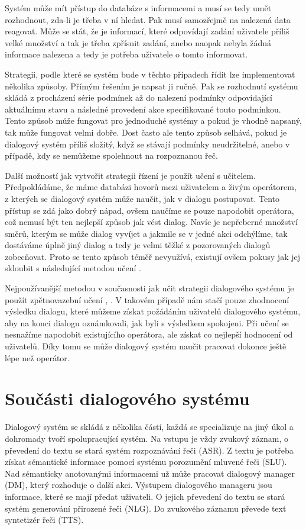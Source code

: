 Systém může mít přístup do databáze s informacemi a musí se tedy umět
rozhodnout, zda-li je třeba v ní hledat. Pak musí samozřejmě na nalezená data
reagovat. Může se stát, že je informací, které odpovídají zadání uživatele
příliš velké množství a tak je třeba zpřísnit zadání, anebo naopak nebyla žádná
informace nalezena a tedy je potřeba uživatele o tomto informovat.

Strategii, podle které se systém bude v těchto případech řídit lze
implementovat několika způsoby. Přímým řešením je napsat ji ručně. Pak se
rozhodnutí systému skládá z procházení série podmínek až do nalezení podmínky
odpovídající aktuálnímu stavu a následné provedení akce specifikované touto
podmínkou. Tento způsob může fungovat pro jednoduché systémy a pokud je vhodně
napsaný, tak může fungovat velmi dobře. Dost často ale tento způsob selhává,
pokud je dialogový systém příliš složitý, když se stávají podmínky
neudržitelné, anebo v případě, kdy se nemůžeme spolehnout na rozpoznanou řeč.

Další možností jak vytvořit strategii řízení je použít učení s učitelem.
Předpokládáme, že máme databázi hovorů mezi uživatelem a živým operátorem, z
kterých se dialogový systém může naučit, jak v dialogu postupovat. Tento
přístup se zdá jako dobrý nápad, ovšem naučíme se pouze napodobit operátora,
což nemusí být ten nejlepší způsob jak vést dialog. Navíc je nepřeberné
množství směrů, kterým se může dialog vyvíjet a jakmile se v jedné akci
odchýlíme, tak dostáváme úplně jiný dialog a tedy je velmi těžké z pozorovaných
dialogů zobecňovat. Proto se tento způsob téměř nevyužívá, existují ovšem
pokusy jak jej skloubit s následující metodou učení \cite{levin2000stochastic}.

Nejpoužívanější metodou v současnosti jak učit strategii dialogového systému
je použít zpětnovazební učení \cite{singh1999reinforcement}, \cite{walker2011application}. 
V takovém případě nám stačí pouze zhodnocení výsledku dialogu, které můžeme získat požádáním uživatelů dialogového systému, aby na konci dialogu oznámkovali, jak byli s výsledkem spokojeni. 
Při učení se nesnažíme napodobit existujícího operátora, ale získat co nejlepší hodnocení od uživatelů.
Díky tomu se může dialogový systém naučit pracovat dokonce ještě lépe než operátor.

\section{Součásti dialogového systému}

Dialogový systém se skládá z několika částí, každá se specializuje na jiný úkol a dohromady tvoří spolupracující systém.
Na vstupu je vždy zvukový záznam, o převedení do textu se stará systém rozpoznávání řeči (ASR).
Z textu je potřeba získat sémantické informace pomocí systému porozumění mluvené řeči (SLU).
Nad sémanticky anotovanými informacemi už může pracovat dialogový manager (DM), který rozhoduje o další akci.
Výstupem dialogového manageru jsou informace, které se mají předat uživateli.
O jejich převedení do textu se stará systém generování přirozené řeči (NLG).
Do zvukového záznamu převede text syntetizér řeči (TTS).

